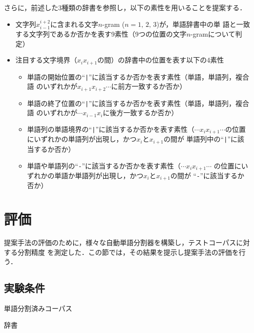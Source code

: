 \documentclass[japanese]{jnlp_JS2.0}
\begin{document}
さらに，前述した3種類の辞書を参照し，以下の素性を用いることを提案する．
\begin{itemize}

\item 文字列$x_{i-1}^{i+2}$に含まれる文字$n$-gram ($n = 1,\,2,\,3$)が，単語辞書中の単
  語と一致する文字列であるか否かを表す9素性（9つの位置の文字$n$-gramについて判定）

\item 注目する文字境界（$x_{i}x_{i+1}$の間）の辞書中の位置を表す以下の4素性
  \begin{itemize}
  \item 単語の開始位置の``\verb*+|+''に該当するか否かを表す素性（単語，単語列，複合語
    のいずれかが$x_{i+1}x_{i+2}\cdots$に前方一致するか否か）
  \item 単語の終了位置の``\verb*+|+''に該当するか否かを表す素性（単語，単語列，複合語
    のいずれかが$\cdots x_{i-1}x_{i}$に後方一致するか否か）
  \item 単語列の単語境界の``\verb*+|+''に該当するか否かを表す素性（$\cdots x_{i}
    x_{i+1} \cdots$の位置にいずれかの単語列が出現し，かつ$x_{i}$と$x_{i+1}$の間が
    単語列中の``\verb*+|+''に該当するか否か）
  \item 単語や単語列の``\verb*+-+''に該当するか否かを表す素性（$\cdots x_{i}x_{i+1}
    \cdots$ の位置にいずれかの単語か単語列が出現し，かつ$x_{i}$と$x_{i+1}$の間が
    ``\verb*+-+''に該当するか否か）
  \end{itemize}
\end{itemize}


\section{評価}
\label{section:評価}
提案手法の評価のために，様々な自動単語分割器を構築し，テストコーパスに対する分割精度
を測定した．この節では，その結果を提示し提案手法の評価を行う．


\subsection{実験条件}

\begin{table}[t]
  \caption{単語分割済みコーパス}
  \label{table:corpus}

\end{table}

\begin{table}[t]
  \caption{辞書}
  \label{table:dictionary}

\end{table}
\end{document}
